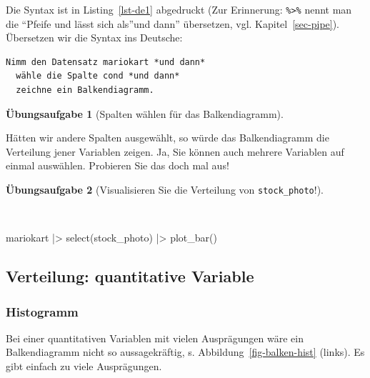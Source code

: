 \documentclass[
  letterpaper,
]{scrbook}
\newenvironment{Shaded}{\begin{snugshade}}{\end{snugshade}}
\newcommand{\FunctionTok}[1]{\textcolor[rgb]{0.28,0.35,0.67}{#1}}
\newcommand{\NormalTok}[1]{\textcolor[rgb]{0.00,0.23,0.31}{#1}}
\newcommand{\SpecialCharTok}[1]{\textcolor[rgb]{0.37,0.37,0.37}{#1}}
\theoremstyle{definition}
\theoremstyle{definition}
\theoremstyle{definition}
\newtheorem{exercise}{Übungsaufgabe}[chapter]
\theoremstyle{remark}
\begin{document}
Die Syntax ist in Listing~\ref{lst-de1} abgedruckt (Zur Erinnerung:
\texttt{\%\textgreater{}\%} nennt man die ``Pfeife und lässt sich
als''und dann'' übersetzen, vgl. Kapitel~\ref{sec-pipe}). Übersetzen wir
die Syntax ins Deutsche:

\begin{verbatim}
Nimm den Datensatz mariokart *und dann*
  wähle die Spalte cond *und dann*
  zeichne ein Balkendiagramm.
\end{verbatim}

\begin{exercise}[Spalten wählen für das
Balkendiagramm]\protect\hypertarget{exr-de1}{}\label{exr-de1}

Hätten wir andere Spalten ausgewählt, so würde das Balkendiagramm die
Verteilung jener Variablen zeigen. Ja, Sie können auch mehrere Variablen
auf einmal auswählen. Probieren Sie das doch mal aus!

\end{exercise}

\begin{exercise}[Visualisieren Sie die Verteilung von
\texttt{stock\_photo}!]\protect\hypertarget{exr-balken}{}\label{exr-balken}

~

\begin{Shaded}
\begin{Highlighting}[]
\NormalTok{mariokart }\SpecialCharTok{|\textgreater{}} 
  \FunctionTok{select}\NormalTok{(stock\_photo) }\SpecialCharTok{|\textgreater{}} 
  \FunctionTok{plot\_bar}\NormalTok{()}
\end{Highlighting}
\end{Shaded}

\end{exercise}

\subsection{Verteilung: quantitative
Variable}\label{verteilung-quantitative-variable}

\subsubsection{Histogramm}\label{histogramm}

Bei einer quantitativen Variablen mit vielen Ausprägungen wäre ein
Balkendiagramm nicht so aussagekräftig, s.
Abbildung~\ref{fig-balken-hist} (links). Es gibt einfach zu viele
Ausprägungen.
\end{document}
